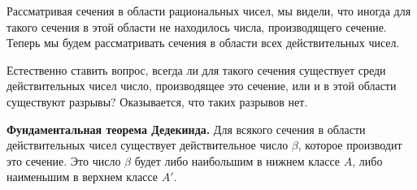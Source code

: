 \begin{rusblock}
Рассматривая сечения в области рациональных чисел, мы видели, что иногда для такого сечения в этой области не находилось числа, производящего сечение. Теперь мы будем рассматривать сечения в области всех действительных чисел.

Естественно ставить вопрос, всегда ли для такого сечения существует среди действительных чисел число, производящее это сечение, или и в этой области существуют разрывы? Оказывается, что таких разрывов нет.

\textbf{Фундаментальная теорема Дедекинда.} Для всякого сечения в области действительных чисел существует действительное число $\beta$, которое производит это сечение. Это число $\beta$ будет либо наибольшим в нижнем классе $A$, либо наименьшим в верхнем классе $A'$.
\end{rusblock}

